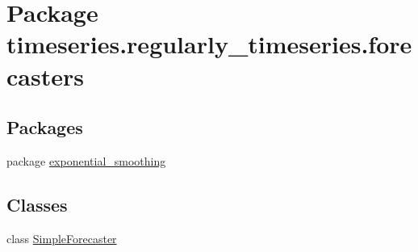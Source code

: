 \hypertarget{namespacetimeseries_1_1regularly__timeseries_1_1forecasters}{}\section{Package timeseries.\+regularly\+\_\+timeseries.\+forecasters}
\label{namespacetimeseries_1_1regularly__timeseries_1_1forecasters}
\subsection*{Packages}
\begin{DoxyCompactItemize}
\item 
package \hyperlink{namespacetimeseries_1_1regularly__timeseries_1_1forecasters_1_1exponential__smoothing}{exponential\+\_\+smoothing}
\end{DoxyCompactItemize}
\subsection*{Classes}
\begin{DoxyCompactItemize}
\item 
class \hyperlink{classtimeseries_1_1regularly__timeseries_1_1forecasters_1_1_simple_forecaster}{Simple\+Forecaster}
\end{DoxyCompactItemize}
